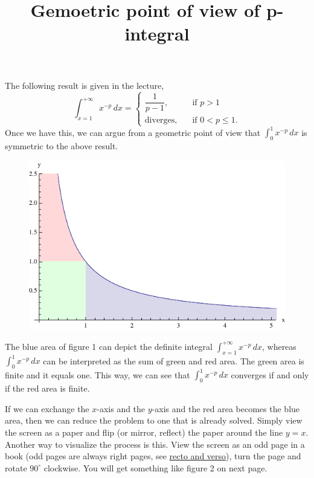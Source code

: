 \documentclass[a4paper]{amsart}
\title{Gemoetric point of view of p-integral}
\begin{document}
    \maketitle
    
    \noindent The following result is given in the lecture,
    \[ \int_{x=1}^{+\infty} x^{-p} \, dx =
        \begin{cases}
        \dfrac{1}{p-1}, \qquad &\text{if } p>1 \\[10pt]
        \text{diverges}, &\text{if } 0 < p \le 1.
        \end{cases} \]
    Once we have this, we can argue from a geometric point of view that $ \int_0^1 x^{-p} \, dx $ is symmetric to the above result.
    
    \begin{figure}[h]
    \centering
    \includegraphics[width=0.7\linewidth]{p_integral_fig1}
    \caption{}
    \label{fig:p_integral_fig1}
    \end{figure}
    
    The blue area of figure 1 can depict the definite integral $ \int_{x=1}^{+\infty} x^{-p} \, dx $, whereas $ \int_0^1 x^{-p} \, dx $ can be interpreted as the sum of green and red area. The green area is finite and it equals one. This way, we can see that $ \int_0^1 x^{-p} \, dx $ converges if and only if the red area is finite.
    
    If we can exchange the $ x $-axis and the $ y $-axis and the red area becomes the blue area, then we can reduce the problem to one that is already solved. Simply view the screen as a paper and f{}lip (or mirror, reflect) the paper around the line $ y=x $. Another way to visualize the process is this. View the screen as an odd page in a book (odd pages are always right pages, see \href{https://en.wikipedia.org/wiki/Recto_and_verso}{recto and verso}), turn the page and rotate $ 90^\circ $ clockwise. You will get something like figure 2 on next page.
    
\end{document}

